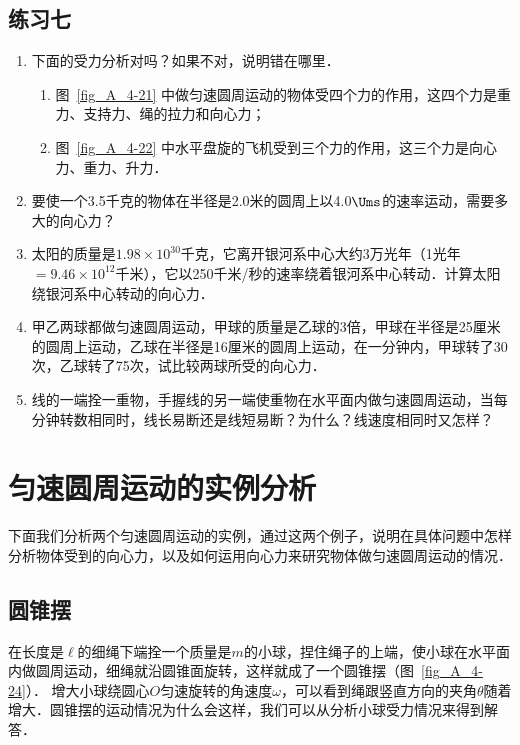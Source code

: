 \subsection*{练习七}
\begin{enumerate}
	\item 下面的受力分析对吗？如果不对，说明错在哪里．
	\begin{enumerate}
		\item 图~\ref{fig_A_4-21} 中做匀速圆周运动的物体受四个力的作用，这四个力是重力、支持力、绳的拉力和向心力；
		\item 图~\ref{fig_A_4-22} 中水平盘旋的飞机受到三个力的作用，这三个力是向心力、重力、升力．
	\end{enumerate}
\item 要使一个3.5千克的物体在半径是2.0米的圆周上以4.0$\Ums$的速率运动，需要多大的向心力？
\item 太阳的质量是$1.98\times 10^{30}$千克，它离开银河系中心大约3万光年（1光年$=9.46\times 10^{12}$千米），它以250千米/秒的速率绕着银河系中心转动．计算太阳绕银河系中心转动的向心力．
\item 甲乙两球都做匀速圆周运动，甲球的质量是乙球的3倍，甲球在半径是25厘米的圆周上运动，乙球在半径是16厘米的圆周上运动，在一分钟内，甲球转了30次，乙球转了75次，试比较两球所受的向心力．
\item 线的一端拴一重物，手握线的另一端使重物在水平面内做匀速圆周运动，当每分钟转数相同时，线长易断还是线短易断？为什么？线速度相同时又怎样？
\end{enumerate}


\section{匀速圆周运动的实例分析}
下面我们分析两个匀速圆周运动的实例，通过这两个例子，说明在具体问题中怎样分析物体受到的向心力，以及如何运用向心力来研究物体做匀速圆周运动的情况．

\subsection{圆锥摆}

在长度是$\ell$的细绳下端拴一个质量是$m$的小球，捏住绳子的上端，使小球在水平面内做圆周运动，细绳就沿圆锥面旋转，这样就成了一个圆锥摆（图~\ref{fig_A_4-24}）．
增大小球绕圆心$O$匀速旋转的角速度$\omega$，可以看到绳跟竖直方向的夹角$\theta$随着增大．圆锥摆的运动情况为什么会这样，我们可以从分析小球受力情况来得到解答．

